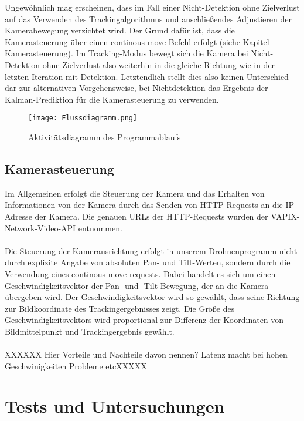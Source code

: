 \documentclass[runningheads]{llncs}
\begin{document}
Ungewöhnlich mag erscheinen, dass im Fall einer Nicht-Detektion ohne Zielverlust auf das Verwenden des Trackingalgorithmus und anschließendes Adjustieren der Kamerabewegung verzichtet wird. Der Grund dafür ist, dass die Kamerasteuerung über einen continous-move-Befehl erfolgt (siehe Kapitel Kamerasteuerung). Im Tracking-Modus bewegt sich die Kamera bei Nicht-Detektion ohne Zielverlust also weiterhin in die gleiche Richtung wie in der letzten Iteration mit Detektion. Letztendlich stellt dies also keinen Unterschied dar zur alternativen Vorgehensweise, bei Nichtdetektion das Ergebnis der Kalman-Prediktion für die Kamerasteuerung zu verwenden.


\begin{figure}
    \centering
    \texttt{[image: Flussdiagramm.png]}
    \caption{Aktivitätsdiagramm des Programmablaufs}
\end{figure}
\FloatBarrier

\subsection{Kamerasteuerung}

Im Allgemeinen erfolgt die Steuerung der Kamera und das Erhalten von Informationen von der Kamera durch das Senden von HTTP-Requests an die IP-Adresse der Kamera. Die genauen URLs der HTTP-Requests wurden der VAPIX-Network-Video-API entnommen.\\\\

Die Steuerung der Kamerausrichtung erfolgt in unserem Drohnenprogramm nicht durch explizite Angabe von absoluten Pan- und Tilt-Werten, sondern durch die Verwendung eines continous-move-requests. Dabei handelt es sich um einen Geschwindigkeitsvektor der Pan- und- Tilt-Bewegung, der an die Kamera übergeben wird. Der Geschwindigkeitsvektor wird so gewählt, dass seine Richtung zur Bildkoordinate des Trackingergebnisses zeigt. Die Größe des Geschwindigkeitsvektors wird proportional zur Differenz der Koordinaten von Bildmittelpunkt und Trackingergebnis gewählt.\\\\

XXXXXX Hier Vorteile und Nachteile davon nennen? Latenz macht bei hohen Geschwinigkeiten Probleme etcXXXXX

\section{Tests und Untersuchungen}
\end{document}
